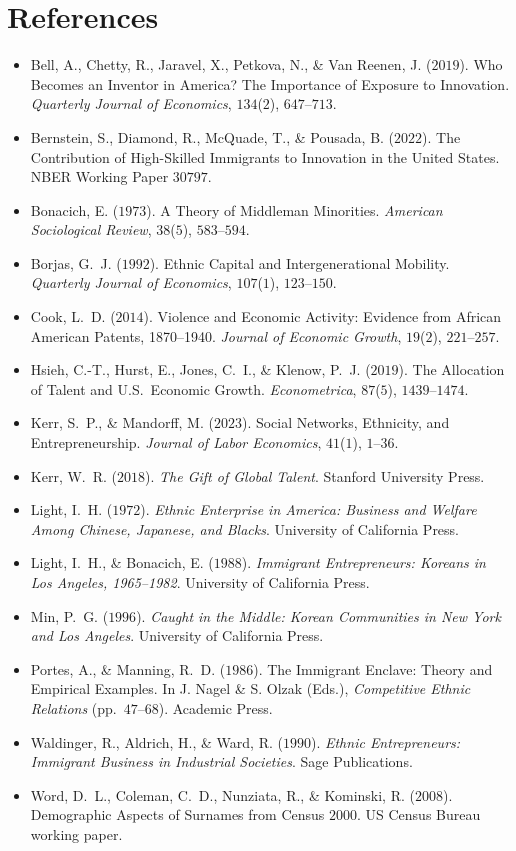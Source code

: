 \documentclass[11pt]{article}
\begin{document}
\section*{References}
\begin{itemize}\setlength\itemsep{2pt}
\item Bell, A., Chetty, R., Jaravel, X., Petkova, N., \& Van Reenen, J.
  ($2019$). Who Becomes an Inventor in America? The Importance of
  Exposure to Innovation. \emph{Quarterly Journal of Economics},
  $134$($2$), $647$--$713$.
\item Bernstein, S., Diamond, R., McQuade, T., \& Pousada, B.
  ($2022$). The Contribution of High-Skilled Immigrants to Innovation
  in the United States. NBER Working Paper $30797$.
\item Bonacich, E. ($1973$). A Theory of Middleman Minorities.
  \emph{American Sociological Review}, $38$($5$), $583$--$594$.
\item Borjas, G.~J. ($1992$). Ethnic Capital and Intergenerational
  Mobility. \emph{Quarterly Journal of Economics}, $107$($1$), $123$--$150$.
\item Cook, L.~D. ($2014$). Violence and Economic Activity: Evidence
  from African American Patents, 1870--1940. \emph{Journal of
  Economic Growth}, $19$($2$), $221$--$257$.
\item Hsieh, C.-T., Hurst, E., Jones, C.~I., \& Klenow, P.~J.
  ($2019$). The Allocation of Talent and U.S.\ Economic Growth.
  \emph{Econometrica}, $87$($5$), $1439$--$1474$.
\item Kerr, S.~P., \& Mandorff, M. ($2023$). Social Networks,
  Ethnicity, and Entrepreneurship. \emph{Journal of Labor Economics},
  $41$($1$), $1$--$36$.
\item Kerr, W.~R. ($2018$). \emph{The Gift of Global Talent}.
  Stanford University Press.
\item Light, I.~H. ($1972$). \emph{Ethnic Enterprise in America:
  Business and Welfare Among Chinese, Japanese, and Blacks}.
  University of California Press.
\item Light, I.~H., \& Bonacich, E. ($1988$). \emph{Immigrant
  Entrepreneurs: Koreans in Los Angeles, 1965--1982}. University
  of California Press.
\item Min, P.~G. ($1996$). \emph{Caught in the Middle: Korean
  Communities in New York and Los Angeles}. University of
  California Press.
\item Portes, A., \& Manning, R.~D. ($1986$). The Immigrant Enclave:
  Theory and Empirical Examples. In J. Nagel \& S. Olzak (Eds.),
  \emph{Competitive Ethnic Relations} (pp.\ $47$--$68$). Academic
  Press.
\item Waldinger, R., Aldrich, H., \& Ward, R. ($1990$).
  \emph{Ethnic Entrepreneurs: Immigrant Business in Industrial
  Societies}. Sage Publications.
\item Word, D.~L., Coleman, C.~D., Nunziata, R., \& Kominski, R.
  ($2008$). Demographic Aspects of Surnames from Census $2000$. US
  Census Bureau working paper.
\end{itemize}
\end{document}
